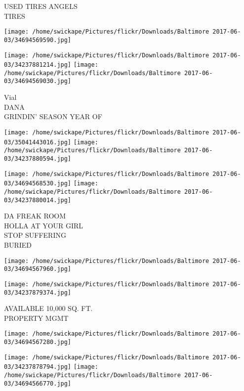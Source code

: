 \documentclass[10pt,letterpaper]{article}
\begin{document}
USED TIRES ANGELS\\
TIRES\\
\pagebreak

\texttt{[image: /home/swickape/Pictures/flickr/Downloads/Baltimore 2017-06-03/34694569590.jpg]}

\vspace{0.25in}
\texttt{[image: /home/swickape/Pictures/flickr/Downloads/Baltimore 2017-06-03/34237881214.jpg]}
\texttt{[image: /home/swickape/Pictures/flickr/Downloads/Baltimore 2017-06-03/34694569030.jpg]}

Vial\\
DANA\\
GRINDIN' SEASON YEAR OF\\
\pagebreak

\texttt{[image: /home/swickape/Pictures/flickr/Downloads/Baltimore 2017-06-03/35041443016.jpg]}
\texttt{[image: /home/swickape/Pictures/flickr/Downloads/Baltimore 2017-06-03/34237880594.jpg]}

\texttt{[image: /home/swickape/Pictures/flickr/Downloads/Baltimore 2017-06-03/34694568530.jpg]}
\texttt{[image: /home/swickape/Pictures/flickr/Downloads/Baltimore 2017-06-03/34237880014.jpg]}

DA FREAK ROOM\\
HOLLA AT YOUR GIRL\\
STOP SUFFERING\\
BURIED\\
\pagebreak

\texttt{[image: /home/swickape/Pictures/flickr/Downloads/Baltimore 2017-06-03/34694567960.jpg]}

\vspace{0.25in}
\texttt{[image: /home/swickape/Pictures/flickr/Downloads/Baltimore 2017-06-03/34237879374.jpg]}

AVAILABLE 10,000 SQ. FT.\\
PROPERTY MGMT\\
\pagebreak

\texttt{[image: /home/swickape/Pictures/flickr/Downloads/Baltimore 2017-06-03/34694567280.jpg]}

\vspace{0.25in}
\texttt{[image: /home/swickape/Pictures/flickr/Downloads/Baltimore 2017-06-03/34237878794.jpg]}
\texttt{[image: /home/swickape/Pictures/flickr/Downloads/Baltimore 2017-06-03/34694566770.jpg]}
\end{document}

